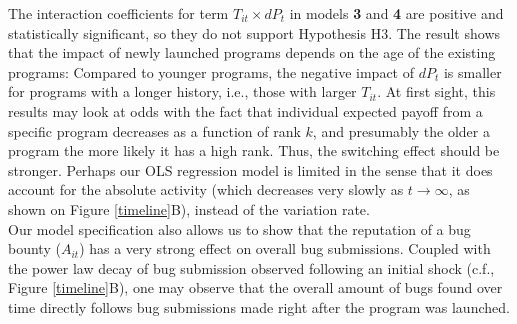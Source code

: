 The interaction coefficients for term $T_{it} \times dP_t$ in models {\bf 3} and {\bf 4} are positive and statistically significant, so they do not support Hypothesis H3. The result shows that the impact of newly launched programs depends on the age of the existing programs: Compared to younger programs, the negative impact of $dP_t$ is smaller for programs with a longer history, i.e., those with larger $T_{it}$. At first sight, this results may look at odds with the fact that individual expected payoff from a specific program decreases as a function of rank $k$, and presumably the older a program the more likely it has a high rank. Thus, the switching effect should be stronger. Perhaps our OLS regression model is limited in the sense that it does account for the absolute activity (which decreases very slowly as $t \rightarrow \infty$, as shown on Figure \ref{timeline}B), instead of the variation rate.\\

Our model specification also allows us to show that the reputation of a bug bounty ($A_{it}$) has a very strong effect on overall bug submissions. Coupled with the power law decay of bug submission observed following an initial shock (c.f., Figure \ref{timeline}B), one may observe that the overall amount of bugs found over time directly follows bug submissions made right after the program was launched.

